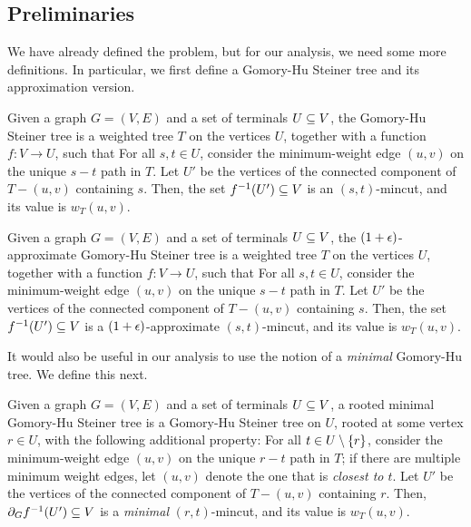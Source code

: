 \subsection{Preliminaries}
We have already defined the \ssc problem, but for our analysis, we need some more definitions. In particular, we first define a Gomory-Hu Steiner tree and its approximation version.

Given a graph $G=(V,E)$ and a set of terminals $U\subseteq V$, the Gomory-Hu Steiner tree is a weighted tree $T$ on the vertices $U$, together with a function $f:V\to U$, such that
 \BI
 \im For all $s,t\in U$, consider the minimum-weight edge $(u,v)$ on the unique $s-t$ path in $T$. Let $U'$ be the vertices of the connected component of $T-(u,v)$ containing $s$.
Then, the set $f^{-1}(U')\subseteq V$ is an $(s,t)$-mincut, and its value is $w_T(u,v)$.
 \EI
\ED

Given a graph $G=(V,E)$ and a set of terminals $U\subseteq V$, the $(1+\epsilon)$-approximate Gomory-Hu Steiner tree is a weighted tree $T$ on the vertices $U$, together with a function $f:V\to U$, such that
 \BI
 \im For all $s,t\in U$, consider the minimum-weight edge $(u,v)$ on the unique $s-t$ path in $T$. Let $U'$ be the vertices of the connected component of $T-(u,v)$ containing $s$.
Then, the set $f^{-1}(U')\subseteq V$ is a $(1+\epsilon)$-approximate $(s,t)$-mincut, and its value is $w_T(u,v)$.
 \EI
\ED

It would also be useful in our analysis to use the notion of a {\em minimal} Gomory-Hu tree. We define this next.

\label{defn:minimalGH}
Given a graph $G=(V,E)$ and a set of terminals $U\subseteq V$, a rooted minimal Gomory-Hu Steiner tree is a Gomory-Hu Steiner tree on $U$, rooted at some vertex $r\in U$, with the following additional property:
 \BI
 \im[$(*)$] For all $t\in U\setminus\{r\}$, consider the minimum-weight edge $(u,v)$ on the unique $r-t$ path in $T$; if there are multiple minimum weight edges, let $(u, v)$ denote the one that is {\em closest to $t$}. Let $U'$ be the vertices of the connected component of $T-(u,v)$ containing $r$.
Then, $\partial_Gf^{-1}(U')\subseteq V$ is a \emph{minimal} $(r,t)$-mincut, and its value is $w_T(u,v)$.
 \EI
\ED

